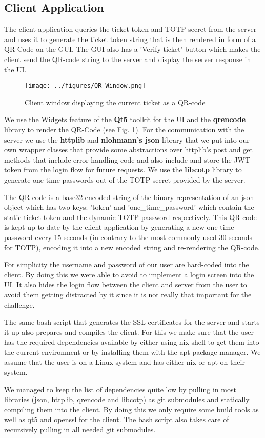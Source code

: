 \subsection{Client Application}
The client application queries the ticket token and TOTP secret from the server and uses it to generate the ticket token string that is then rendered in form of a QR-Code on the GUI. The GUI also has a 'Verify ticket' button which makes the client send the QR-code string to the server and display the server response in the UI.

\begin{figure}[H]
    \centering
    \texttt{[image: ../figures/QR\_Window.png]}
    \caption{Client window displaying the current ticket as a QR-code}
    \label{fig:QR_Window}
\end{figure}

We use the Widgets feature of the \textbf{Qt5} toolkit for the UI and the \textbf{qrencode} library to render the QR-Code (see Fig. \ref{fig:QR_Window}). For the communication with the server we use the \textbf{httplib} and \textbf{nlohmann's json} library that we put into our own wrapper classes that provide some abstractions over httplib's post and get methods that include error handling code and also include and store the JWT token from the login flow for future requests. We use the \textbf{libcotp} library to generate one-time-passwords out of the TOTP secret provided by the server.

The QR-code is a base32 encoded string of the binary representation of an json object which has two keys: 'token' and 'one\_time\_password' which contain the static ticket token and the dynamic TOTP password respectively. This QR-code is kept up-to-date by the client application by generating a new one time password every 15 seconds (in contrary to the most commonly used 30 seconds for TOTP), encoding it into a new encoded string and re-rendering the QR-code.

For simplicity the username and password of our user are hard-coded into the client. By doing this we were able to avoid to implement a login screen into the UI. It also hides the login flow between the client and server from the user to avoid them getting distracted by it since it is not really that important for the challenge.

The same bash script that generates the SSL certificates for the server and starts it up also prepares and compiles the client. For this we make sure that the user has the required dependencies available by either using nix-shell to get them into the current environment or by installing them with the apt package manager. We assume that the user is on a Linux system and has either nix or apt on their system.

We managed to keep the list of dependencies quite low by pulling in most libraries (json, httplib, qrencode and libcotp) as git submodules and statically compiling them into the client. By doing this we only require some build tools as well as qt5 and openssl for the client. The bash script also takes care of recursively pulling in all needed git submodules.
